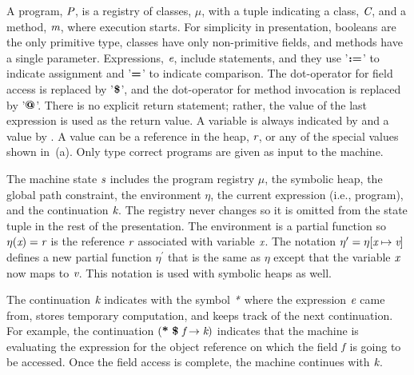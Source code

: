 A program, $\emph{P}$, is a registry of classes, $\mu$, with
a tuple indicating a class, $\emph{C}$, and a method, $\emph{m}$,
where execution starts. For simplicity in presentation, booleans are the only primitive type, 
classes have only non-primitive fields, and methods have a single
parameter. Expressions, $\emph{e}$, include statements, and they use
'$\textbf{:=}$' to indicate assignment and '$\textbf{=}$' to indicate
comparison.  The dot-operator for field access is replaced by
'$\textbf{\$}$', and the dot-operator for method invocation is replaced
by '$\textbf{@}$'. There is no
explicit return statement; rather, the value of the last expression is
used as the return value. A variable is always indicated by 
and a value by . A value can be a reference in the heap,
$\emph{r}$, or any of the special values shown
in~(a).  Only type correct programs are given as
input to the machine.


The machine state $\emph{s}$ includes the program
registry $\mu$, the symbolic heap, the global path constraint, the environment $\eta$, the current expression (i.e., program), and the continuation $\emph{k}$. The registry never changes so it is
omitted from the state tuple in the rest of the presentation. The environment is a partial function so $\eta(\emph{x}) = \emph{r}$ is the reference
$\emph{r}$ associated with variable $\emph{x}$. The notation
$\eta^\prime = \eta[\emph{x} \mapsto \emph{v}]$ defines a new
partial function $\eta^\prime$ that is the same as $\eta$ except that
the variable $\emph{x}$ now maps to $\emph{v}$. This notation is used with symbolic heaps as well. 

The continuation
$\emph{k}$ indicates with the symbol $\emph{*}$ where the expression $\emph{e}$ came from, stores
temporary computation, and keeps track of the next continuation. For
example, the continuation $(\textbf{*}\ \textbf{\$}\ \emph{f}
\rightarrow \emph{k})$ indicates that the machine is evaluating the
expression for the object reference on which the field $\emph{f}$ is
going to be accessed. Once the field access is complete, the machine
continues with $\emph{k}$.  

